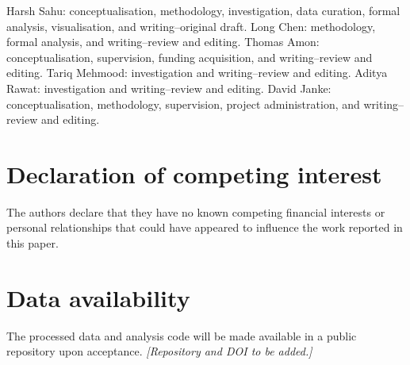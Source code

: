 \documentclass[12pt,a4paper]{article}
\begin{document}
Harsh Sahu: conceptualisation, methodology, investigation, data curation,
formal analysis, visualisation, and writing--original draft. Long Chen:
methodology, formal analysis, and writing--review and editing. Thomas Amon:
conceptualisation, supervision, funding acquisition, and writing--review and
editing. Tariq Mehmood: investigation and writing--review and editing. Aditya
Rawat: investigation and writing--review and editing. David Janke:
conceptualisation, methodology, supervision, project administration, and
writing--review and editing.

\section*{Declaration of competing interest}

The authors declare that they have no known competing financial interests or
personal relationships that could have appeared to influence the work
reported in this paper.

\section*{Data availability}

The processed data and analysis code will be made available in a public
repository upon acceptance. \textit{[Repository and DOI to be added.]}



\end{document}

